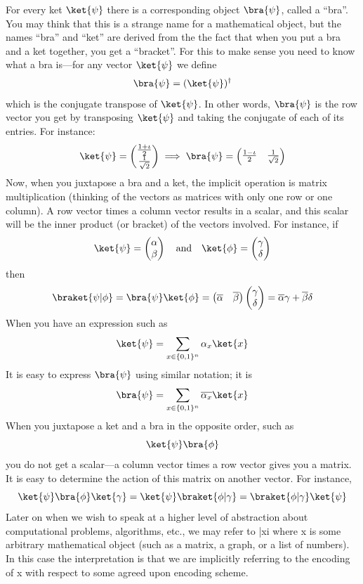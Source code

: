\documentclass[12pt, oneside]{book}
\theoremstyle{definition}
\theoremstyle{definition}
\theoremstyle{remark}
\begin{document}
For every ket $\ket{\psi}$ there is a corresponding object $\bra{\psi}$, called a “bra”. You may think that this is
a strange name for a mathematical object, but the names “bra” and “ket” are derived from the the fact that when you put a bra and a ket together, you get a “bracket”. For this to make sense you
need to know what a bra is—for any vector $\ket{\psi}$ we define
\[
\bra{\psi}=(\ket{\psi})^{\dagger}
\]
which is the conjugate transpose of $\ket{\psi}$. In other words, $\bra{\psi}$ is the row vector you get by transposing
$\ket{\psi}$ and taking the conjugate of each of its entries. For instance:
\[
\ket{\psi}=\begin{pmatrix} \frac{1 + \iota }{2} \\ \frac{1}{\sqrt{2}} \end{pmatrix} \implies \bra{\psi}=\begin{pmatrix} \frac{1-\iota}{2} & \frac{1}{\sqrt{2}} \end{pmatrix}
\]
Now, when you juxtapose a bra and a ket, the implicit operation is matrix multiplication (thinking
of the vectors as matrices with only one row or one column). A row vector times a column vector
results in a scalar, and this scalar will be the inner product (or bracket) of the vectors involved. For
instance, if
\[
\ket{\psi}=\begin{pmatrix} \alpha \\ \beta \end{pmatrix} \quad \text{and}\quad \ket{\phi}=\begin{pmatrix} \gamma \\ \delta \end{pmatrix}
\]
then
\[
\braket{\psi|\phi} = \bra{\psi} \ket{\phi}=\begin{pmatrix} \overline{\alpha} & \overline{\beta} \end{pmatrix} \begin{pmatrix} \gamma \\ \delta \end{pmatrix} =\overline{\alpha}\gamma + \overline{\beta}\delta 
\]
When you have an expression such as
\[
\ket{\psi}=\sum_{x\in\{0,1\}^n} \alpha_x \ket{x}
\]
It is easy to express $\bra{\psi}$ using similar notation; it is
\[
\bra{\psi}=\sum_{x\in\{0,1\}^n} \overline{\alpha_x} \ket{x}
\]
When you juxtapose a ket and a bra in the opposite order, such as
\[
\ket{\psi}\bra{\phi}
\]
you do not get a scalar—a column vector times a row vector gives you a matrix. It is easy to
determine the action of this matrix on another vector. For instance,
\[
\ket{\psi}\bra{\phi}\ket{\gamma}=\ket{\psi}\braket{\phi|\gamma}=\braket{\phi|\gamma}\ket{\psi}
\]
Later on when we wish to speak at a higher level of abstraction about computational problems,
algorithms, etc., we may refer to |xi where x is some arbitrary mathematical object (such as a
matrix, a graph, or a list of numbers). In this case the interpretation is that we are implicitly
referring to the encoding of x with respect to some agreed upon encoding scheme.
\end{document}
